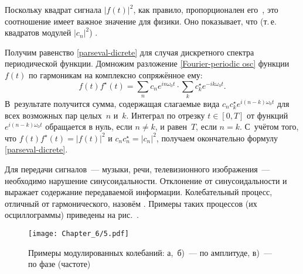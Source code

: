 Поскольку квадрат сигнала $|f(t)|^2$, как правило, пропорционален
его~, это соотношение имеет важное значение для физики.
Оно показывает, что  (т.\,е. квадратов модулей $|c_n|^2$)
.

Получим равенство \eqref{parseval-dicrete} для случая дискретного спектра
периодической функции. 
Домножим разложение
\eqref{Fourier-periodic osc} функции $f(t)$ по гармоникам на комплексно
сопряжённое ему:
\begin{equation*}f(t)f^{\star}(t) = \sum\limits_n c_n e^{i n \omega_0 t} \cdot \sum\limits_k c_k^{\star} e^{-i k \omega_0 t}.\end{equation*}
В~результате получится сумма, содержащая слагаемые вида
$c_n c_k^{\star} e^{i(n-k)\omega_0 t}$ для всех возможных пар целых~$n$ и~$k$.
Интеграл по отрезку $t\in[0,T]$ от функций $e^{i(n-k)\omega_0 t}$
обращается в нуль, если $n\ne k$, и равен~$T$, если $n=k$.
С~учётом того, что $f(t)f^{\star}(t) = |f(t)|^2$ и
$c_n c_n^{\star} = |c_n|^2$, получаем окончательно формулу
\eqref{parseval-dicrete}.




Для передачи сигналов~--- музыки, речи, телевизионного изображения~---
необходимо нарушение синусоидальности. Отклонение
от синусоидальности и выражает содержание передаваемой информации. Колебательный
процесс, отличный от гармонического,
назовём . Примеры таких процессов (их
осциллограммы) приведены на рис.~.

\begin{figure}[h!]
    \texttt{[image: Chapter\_6/5.pdf]}
    \caption{Примеры модулированных колебаний: а,~б)~--- по амплитуде,
    в)~--- по фазе (частоте)}
\end{figure}

